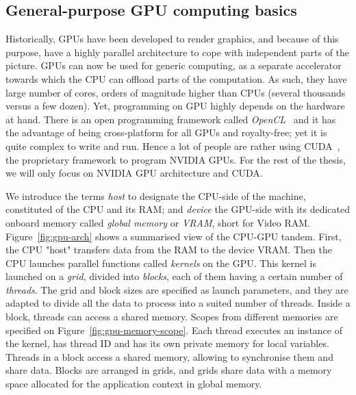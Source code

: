 \subsection{General-purpose GPU computing basics}

Historically, GPUs have been developed to render graphics, and because of this purpose, have a highly parallel architecture to cope with independent parts of the picture. GPUs can now be used for generic computing, as a separate accelerator towards which the CPU can offload parts of the computation. As such, they have large number of cores, orders of magnitude higher than CPUs (several thousands versus a few dozen). Yet, programming on GPU highly depends on the hardware at hand. There is an open programming framework called \emph{OpenCL}~\cite{misc:opencl} and it has the advantage of being cross-platform for all GPUs and royalty-free; yet it is quite complex to write and run. Hence a lot of people are rather using CUDA~\cite{misc:cuda}, the proprietary framework to program NVIDIA GPUs. For the rest of the thesis, we will only focus on NVIDIA GPU architecture and CUDA.

We introduce the terms \emph{host} to designate the CPU-side of the machine, constituted of the CPU and its RAM; and \emph{device} the GPU-side with its dedicated onboard memory called \emph{global memory} or \emph{VRAM}, short for Video RAM. Figure~\ref{fig:gpu-arch} shows a summarised view of the CPU-GPU tandem. First, the CPU "host" transfers data from the RAM to the device VRAM. Then the CPU launches parallel functions called \emph{kernels} on the GPU. This kernel is launched on a \emph{grid}, divided into \emph{blocks}, each of them having a certain number of \emph{threads}. The grid and block sizes are specified as launch parameters, and they are adapted to divide all the data to process into a suited number of threads. Inside a block, threads can access a shared memory. Scopes from different memories are specified on Figure~\ref{fig:gpu-memory-scope}. Each thread executes an instance of the kernel, has thread ID and has its own private memory for local variables. Threads in a block access a shared memory, allowing to synchronise them and share data. Blocks are arranged in grids, and grids share data with a memory space allocated for the application context in global memory.

